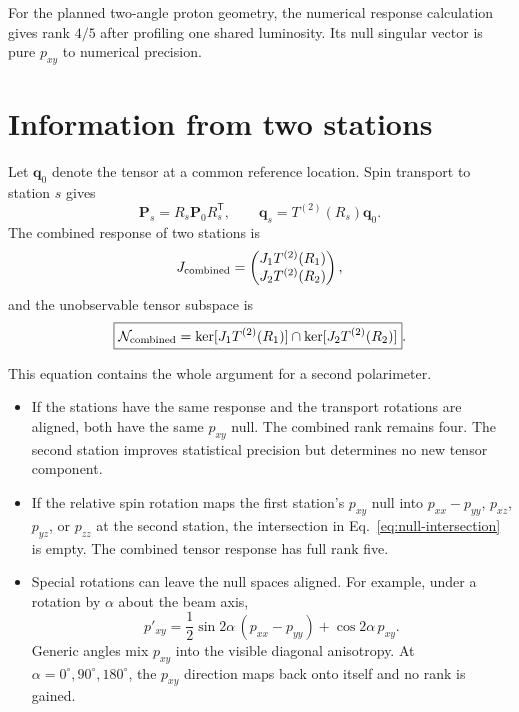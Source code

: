 \documentclass[11pt,a4paper]{article}
\newcommand{\Tens}{\bm P}
\newcommand{\vect}[1]{\bm{#1}}
\newcommand{\Null}{\mathcal N}
\begin{document}
For the planned two-angle proton geometry, the numerical response calculation
gives rank $4/5$ after profiling one shared luminosity.  Its null singular vector
is pure $p_{xy}$ to numerical precision.

\section{Information from two stations}

Let $\vect q_0$ denote the tensor at a common reference location.  Spin transport
to station $s$ gives
\begin{equation}
 \Tens_s=R_s\Tens_0R_s^{\mathsf T},\qquad
 \vect q_s=T^{(2)}(R_s)\vect q_0.
\end{equation}
The combined response of two stations is
\begin{equation}
 J_{\rm combined}=
 \begin{pmatrix}
 J_1T^{(2)}(R_1)\\
 J_2T^{(2)}(R_2)
 \end{pmatrix},
\end{equation}
and the unobservable tensor subspace is
\begin{equation}
 \boxed{
 \Null_{\rm combined}
 =\ker[J_1T^{(2)}(R_1)]\cap
  \ker[J_2T^{(2)}(R_2)] }.
 \label{eq:null-intersection}
\end{equation}

This equation contains the whole argument for a second polarimeter.
\begin{itemize}
 \item If the stations have the same response and the transport rotations are
 aligned, both have the same $p_{xy}$ null.  The combined rank remains four.
 The second station improves statistical precision but determines no new tensor
 component.
 \item If the relative spin rotation maps the first station's $p_{xy}$ null into
 $p_{xx}-p_{yy}$, $p_{xz}$, $p_{yz}$, or $p_{zz}$ at the second station, the
 intersection in Eq.~\eqref{eq:null-intersection} is empty.  The combined tensor
 response has full rank five.
 \item Special rotations can leave the null spaces aligned.  For example, under
 a rotation by $\alpha$ about the beam axis,
 \begin{equation}
 p'_{xy}=\frac12\sin2\alpha\,(p_{xx}-p_{yy})
          +\cos2\alpha\,p_{xy}.
 \end{equation}
 Generic angles mix $p_{xy}$ into the visible diagonal anisotropy.  At
 $\alpha=0^\circ,90^\circ,180^\circ$, the $p_{xy}$ direction maps back onto
 itself and no rank is gained.
\end{itemize}
\end{document}
